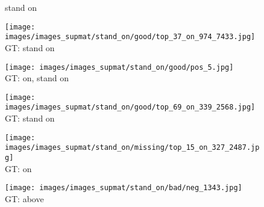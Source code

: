 \documentclass[10pt,twocolumn,letterpaper]{article}
\begin{document}
\begin{figure*}[t]
\begin{minipage}[t]{0.005\textwidth}
    	\centering
    	\vspace{-9.5ex}
    	\begin{turn}{90}
    	stand on
    	\end{turn}
    	\vspace{5ex}
   	\end{minipage}
    \hspace{0.01\textwidth}
\begin{minipage}[t]{0.18\textwidth}
    	\centering
       	\texttt{[image: images/images\_supmat/stand\_on/good/top\_37\_on\_974\_7433.jpg]}\\
       	\vspace{0.3ex}
GT: stand on
       	\vspace{0.2ex}
    \end{minipage}
    \hspace{0.005\textwidth}
\begin{minipage}[t]{0.18\textwidth}
    	\centering
       	\texttt{[image: images/images\_supmat/stand\_on/good/pos\_5.jpg]}\\
       	\vspace{0.3ex}
GT: on, stand on
       	\vspace{0.2ex}
    \end{minipage} 
    \hspace{0.005\textwidth}
\begin{minipage}[t]{0.18\textwidth}
    	\centering
       	\texttt{[image: images/images\_supmat/stand\_on/good/top\_69\_on\_339\_2568.jpg]}\\
       	\vspace{0.3ex}
GT: stand on
       	\vspace{0.2ex}
    \end{minipage}  
    \hspace{0.005\textwidth}
\begin{minipage}[t]{0.18\textwidth}
       	\centering
    	\texttt{[image: images/images\_supmat/stand\_on/missing/top\_15\_on\_327\_2487.jpg]}\\
    	\vspace{0.3ex}
GT: on
       	\vspace{0.2ex}
    \end{minipage}
    \hspace{0.005\textwidth}
\begin{minipage}[t]{0.18\textwidth}
    	\centering
       	\texttt{[image: images/images\_supmat/stand\_on/bad/neg\_1343.jpg]}\\
       	\vspace{0.3ex}
GT: above
       	\vspace{0.2ex}
    \end{minipage}      


\end{figure*}
\end{document}
